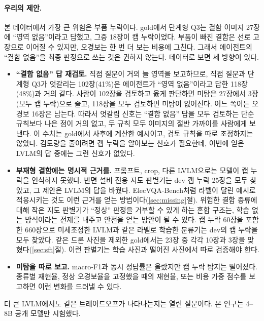 \documentclass[11pt]{article}
\begin{document}
\paragraph{우리의 제안.} 본 데이터에서 가장 큰 위험은 부품 누락이다. gold에서 단계형 Q3는 결함 이미지 27장에 ``영역 없음''이라고 답했고, 그중 18장이 캡 누락이었다. 부품이 빠진 결함은 선로 고장으로 이어질 수 있지만, 오경보는 한 번 더 보는 비용에 그친다. 그래서 에이전트의 ``결함 없음''을 최종 판정으로 쓰는 것은 권하지 않는다. 데이터로 보면 세 방향이 있다.
\begin{itemize}
  \item \textbf{``결함 없음'' 답 재검토.} 직접 질문이 거의 늘 영역을 보고하므로, 직접 질문과 단계형 Q3가 엇갈리는 102장(41\%)은 에이전트가 ``영역 없음''이라고 답한 118장(48\%)과 거의 같다. 사람이 102장을 검토하고 옳게 판단하면 미탐은 27장에서 3장(모두 캡 누락)으로 줄고, 118장을 모두 검토하면 미탐이 없어진다. 어느 쪽이든 오경보 16장은 남는다. 따라서 엇갈림 신호는 ``결함 없음'' 답을 모두 검토하는 단순 규칙보다 나은 점이 거의 없고, 두 규칙 모두 이미지의 절반 가까이를 사람에게 보낸다. 이 수치는 gold에서 사후에 계산한 예시이고, 검토 규칙을 따로 조정하지는 않았다. 검토량을 줄이려면 캡 누락을 알아보는 신호가 필요한데, 이번에 얻은 LVLM의 답 중에는 그런 신호가 없었다.
  \item \textbf{부재형 결함에는 명시적 근거를.} 프롬프트, crop, 다른 LVLM으로는 모델이 캡 누락을 인식하지 못했다. 반면 설비 전용 지도 판별기는 dev 캡 누락 25장을 모두 찾았고, 그 제안은 LVLM의 답을 바꿨다. ElecVQA-Bench처럼 라벨이 달린 예시로 적응시키는 것도 이런 근거를 얻는 방법이다(\ref{sec:missing}절). 위험한 결함 종류에 대해 작은 지도 판별기가 ``정상'' 판정을 거부할 수 있게 하는 혼합 구조는, 학습 없는 방식이라는 전제를 내주고 안전을 얻는 방안이 될 수 있다. 캡 누락 60장을 포함한 660장으로 미세조정한 LVLM과 같은 라벨로 학습한 분류기는 dev의 캡 누락을 모두 찾았다. 같은 드론 사진을 제외한 gold에서는 23장 중 각각 10장과 3장을 맞혔다(\ref{sec:sft}절). 이런 판별기는 학습 사진과 떨어진 사진에서 따로 검증해야 한다.
  \item \textbf{미탐을 따로 보고.} macro-F1과 동시 정답률은 올랐지만 캡 누락 탐지는 떨어졌다. 종류별 재현율, 정상 오경보율을 고정했을 때의 재현율, 또는 비용 가중 점수를 보고하면 이런 변화를 드러낼 수 있다.
\end{itemize}
더 큰 LVLM에서도 같은 트레이드오프가 나타나는지는 열린 질문이다. 본 연구는 4--8B 공개 모델만 시험했다.
\end{document}
